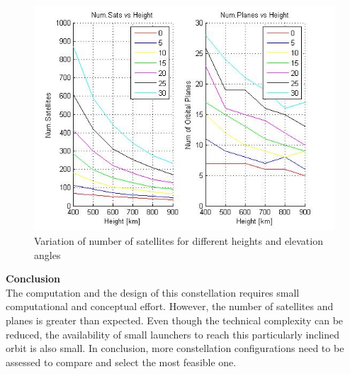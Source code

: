 \begin{figure}[H]
\begin{center}
\includegraphics[scale=0.6]{PolarOrbits/GeneralResults.jpg}
\caption{Variation of number of satellites for different heights and elevation angles}
\end{center}
\end{figure}

%

\textbf{Conclusion}\\
The computation and the design of this constellation requires small computational and conceptual effort. However, the number of satellites and planes is greater than expected. Even though the technical complexity can be reduced, the availability of small launchers to reach this particularly inclined orbit is also small. In conclusion, more constellation configurations need to be assessed to compare and select the most feasible one.

%
%